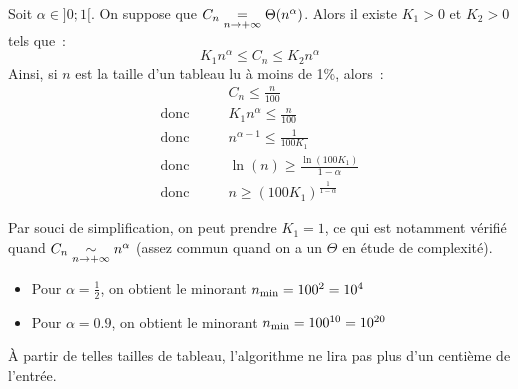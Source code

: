 Soit $\alpha \in ]0 ; 1[$. On suppose que $C_n \underset{n \to + \infty}{\overset{{}}{=}} \Theta(n^\alpha)$. Alors il existe $K_1 > 0$ et $K_2 > 0$ tels que~:
$$K_1 n^\alpha \leq C_n \leq K_2 n^\alpha$$
Ainsi, si $n$ est la taille d'un tableau lu à moins de 1\%, alors~:
\begin{align*}
    &C_n \leq \frac{n}{100}\\
    \text{donc} \qquad &K_1 n^\alpha \leq \frac{n}{100}\\
    \text{donc} \qquad &n^{\alpha-1} \leq \frac{1}{100 K_1}\\
    \text{donc} \qquad &\ln(n) \geq \frac{\ln(100K_1)}{1-\alpha}\\
    \text{donc} \qquad &n \geq (100K_1)^{\frac{1}{1-\alpha}}
\end{align*}

Par souci de simplification, on peut prendre $K_1 = 1$, ce qui est notamment vérifié quand $C_n \underset{n \to + \infty}{\overset{{}}{\sim}} n^\alpha$ (assez commun quand on a un $\Theta$ en étude de complexité).
\begin{itemize}
    \item Pour $\alpha = \frac{1}{2}$, on obtient le minorant $n_{\mathrm{min}} = 100^2 = 10^4$
    \item Pour $\alpha = 0.9$, on obtient le minorant $n_{\mathrm{min}} = 100^{10} = 10^{20}$
\end{itemize}

À partir de telles tailles de tableau, l'algorithme ne lira pas plus d'un centième de l'entrée.




